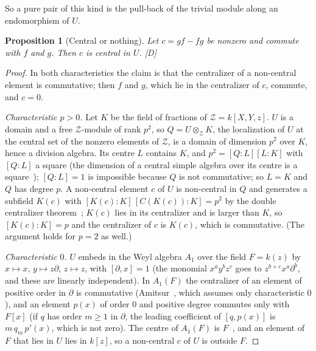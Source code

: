 \documentclass[11pt]{article}
\newtheorem{proposition}{Proposition}
\theoremstyle{definition}
\theoremstyle{remark}
\begin{document}
So a pure pair of this kind is the pull-back of the trivial module along an endomorphism of $U$.

\begin{proposition}[Central or nothing]\label{prop:central}
Let $c=gf-fg$ be nonzero and commute with $f$ and $g$. Then $c$ is central in $U$. [D]
\end{proposition}
\begin{proof}
In both characteristics the claim is that the centralizer of a non-central element is commutative; then $f$ and $g$, which lie in the centralizer of $c$, commute, and $c=0$.

\emph{Characteristic $p>0$.} Let $K$ be the field of fractions of $\mathcal Z=k[X,Y,z]$. $U$ is a domain and a free $\mathcal Z$-module of rank $p^2$, so $Q=U\otimes_{\mathcal Z}K$, the localization of $U$ at the central set of the nonzero elements of $\mathcal Z$, is a domain of dimension $p^2$ over $K$, hence a division algebra. Its centre $L$ contains $K$, and $p^2=[Q:L][L:K]$ with $[Q:L]$ a square (the dimension of a central simple algebra over its centre is a square~\cite{StacksCSA}); $[Q:L]=1$ is impossible because $Q$ is not commutative; so $L=K$ and $Q$ has degree $p$. A non-central element $c$ of $U$ is non-central in $Q$ and generates a subfield $K(c)$ with $[K(c):K]\,[C(K(c)):K]=p^2$ by the double centralizer theorem~\cite{StacksDCT}; $K(c)$ lies in its centralizer and is larger than $K$, so $[K(c):K]=p$ and the centralizer of $c$ is $K(c)$, which is commutative. (The argument holds for $p=2$ as well.)

\emph{Characteristic $0$.} $U$ embeds in the Weyl algebra $A_1$ over the field $F=k(z)$ by $x\mapsto x$, $y\mapsto z\partial$, $z\mapsto z$, with $[\partial,x]=1$ (the monomial $x^ay^bz^c$ goes to $z^{b+c}x^a\partial^b$, and these are linearly independent). In $A_1(F)$ the centralizer of an element of positive order in $\partial$ is commutative (Amitsur~\cite[Theorem~1(2)]{Amitsur}, which assumes only characteristic $0$), and an element $p(x)$ of order $0$ and positive degree commutes only with $F[x]$ (if $q$ has order $m\ge1$ in $\partial$, the leading coefficient of $[q,p(x)]$ is $m\,q_m\,p'(x)$, which is not zero). The centre of $A_1(F)$ is $F$~\cite{Dixmier}, and an element of $F$ that lies in $U$ lies in $k[z]$, so a non-central $c$ of $U$ is outside $F$.
\end{proof}
\end{document}
